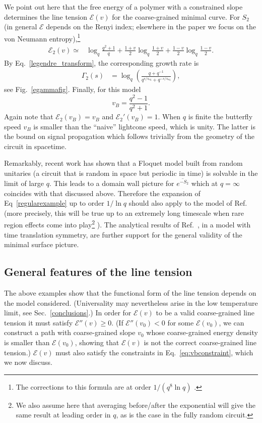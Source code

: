 \documentclass[aps,prx,twocolumn,superscriptaddress,floatfix,nofootinbib,prx]{revtex4}
\newcommand{\f}{\frac}
\renewcommand{\>}{\right\rangle}
\newcommand{\<}{\left\langle}
\newcommand{\ba}{\begin{align}}
\newcommand{\be}{\begin{equation}}
\newcommand{\ee}{\end{equation}}
\newcommand{\lf}{\left(}
\newcommand{\ri}{\right)}
\newcommand{\seq}{s_\text{eq}}
\newcommand{\lt}{\mathcal{E}}
\begin{document}
We point out here that the free energy of a polymer with a constrained slope determines the  line tension $\lt(v)$ for the coarse-grained minimal curve.
For $S_2$ (in general $\lt$ depends on the Renyi index; elsewhere in the paper we focus on the von Neumann entropy),\footnote{The corrections to this formula are at order $1/(q^8 \ln q)$ \cite{zhounahum}.}
\ba\label{regularexample}
\lt_2 (v) \simeq & \log_q  \f{q^2+1}{q} 
 +  \f{1+v}{2}  \log_q    \f{1+v}{2}   +    \f{1- v}{2}  \log_q    \f{1-v}{2}.
\end{align}
By Eq.~\ref{legendre_transform}, the corresponding growth rate is
\ba \label{regularexamplegamma}
\Gamma_2(s) & = \log_q \lf \f{q+q^{-1}}{q^{s/\seq}+ q^{-s/\seq}} \ri,
\end{align}
see Fig.~\ref{egammafig}. Finally, for this model\cite{nahum3, keyserlingk}
\be
v_B = \f{q^2-1}{q^2+1}.
\ee
Again note that $\lt_2(v_B) = v_B$ and $\lt_2'(v_B)=1$. When $q$ is finite the butterfly speed $v_B$ is smaller than the ``naive'' lightcone speed, which is unity. The latter is the bound on signal propagation which follows trivially from the geometry of the circuit in spacetime.  

Remarkably, recent work \cite{amosandreajohn} has shown that a Floquet model built from random unitaries (a circuit that is random in space but periodic in time) is solvable in the limit of large $q$. This leads to a domain wall picture for $\overline{e^{-S_2}}$ which at $q=\infty$ coincides with that discussed above. Therefore the expansion of Eq~\ref{regularexample} up to order $1/\ln q$ should also apply to the model of Ref.~\cite{amosandreajohn} (more precisely, this will be true up to an extremely long timescale when rare region effects come into play\footnote{We also assume here that averaging before/after the exponential will give the same result at leading order in $q$, as is the case in the fully random circuit.} \cite{nahum2}). The analytical results of Ref.~\cite{amosandreajohn}, in a model with time translation symmetry, are further support for the general validity of the minimal surface picture.


\subsection{General features of the line tension}
\label{general_features}

The above examples show that the functional form of the line tension depends on the model considered. (Universality may nevertheless arise in the low temperature limit, see Sec.~\ref{conclusions}.) 
In order for $\lt(v)$ to be a valid coarse-grained line tension it must satisfy  $\lt''(v)\geq 0$.  (If $\lt''(v_0)< 0$ for some $\lt(v_0)$, we can construct a path with coarse-grained slope $v_0$ whose coarse-grained energy density is smaller than $\lt(v_0)$, showing that $\lt(v)$ is not the correct coarse-grained line tension.) $\lt(v)$ must also satisfy the constraints in Eq.~\ref{eq:vbconstraint}, which we now discuss.
\end{document}
